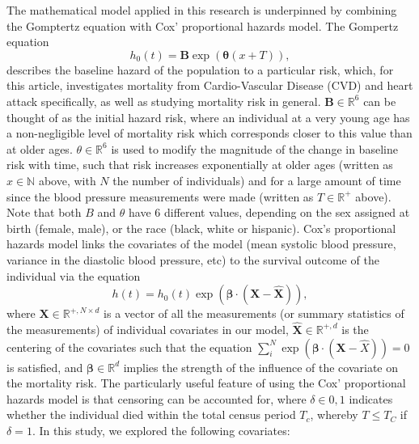 \documentclass[
]{article}
\begin{document}
The mathematical model applied in this research is underpinned by
combining the Gomptertz equation with Cox' proportional hazards model.
The Gompertz equation \begin{equation}\label{gompertz}
h_0(t)=\boldsymbol{B}\exp{\left(\boldsymbol{\theta}(x+T)\right)},
\end{equation} describes the baseline hazard of the population to a
particular risk, which, for this article, investigates mortality from
Cardio-Vascular Disease (CVD) and heart attack specifically, as well as
studying mortality risk in general. \(\boldsymbol{B}\in\mathbb{R}^{6}\)
can be thought of as the initial hazard risk, where an individual at a
very young age has a non-negligible level of mortality risk which
corresponds closer to this value than at older ages.
\(\theta\in\mathbb{R}^{6}\) is used to modify the magnitude of the
change in baseline risk with time, such that risk increases
exponentially at older ages (written as \(x\in\mathbb{N}\) above, with
\(N\) the number of individuals) and for a large amount of time since
the blood pressure measurements were made (written as
\(T\in\mathbb{R}^+\) above). Note that both \(B\) and \(\theta\) have 6
different values, depending on the sex assigned at birth (female, male),
or the race (black, white or hispanic). Cox's proportional hazards model
links the covariates of the model (mean systolic blood pressure,
variance in the diastolic blood pressure, etc) to the survival outcome
of the individual via the equation \begin{equation}\label{prophaz}
h(t)=h_0(t)\exp{\left(\boldsymbol{\beta}\cdot(\boldsymbol{X}-\hat{\boldsymbol{X}})\right)},
\end{equation} where \(\boldsymbol{X}\in\mathbb{R}^{+,N\times d}\) is a
vector of all the measurements (or summary statistics of the
measurements) of individual covariates in our model,
\(\hat{\boldsymbol{X}}\in\mathbb{R}^{+,d}\) is the centering of the
covariates such that the equation
\(\sum_i^N \exp{(\boldsymbol{\beta}\cdot(\boldsymbol{X}-\hat{X}))}=0\)
is satisfied, and \(\boldsymbol{\beta}\in\mathbb{R}^d\) implies the
strength of the influence of the covariate on the mortality risk. The
particularly useful feature of using the Cox' proportional hazards model
is that censoring can be accounted for, where \(\delta\in{0,1}\)
indicates whether the individual died within the total census period
\(T_c\), whereby \(T\leq T_C\) if \(\delta=1\). In this study, we
explored the following covariates:
\end{document}
